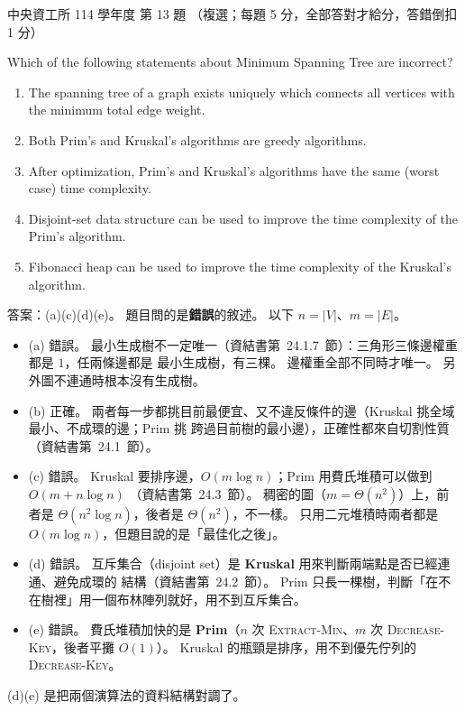 \begin{pastexam}[label={px:ncu-114-dsa-13}]{中央資工所 114 學年度 第 13 題}
（複選；每題 5 分，全部答對才給分，答錯倒扣 1 分）

Which of the following statements about Minimum Spanning Tree are incorrect?
\begin{enumerate}[label=(\alph*)]
\item The spanning tree of a graph exists uniquely which connects all vertices with the minimum total
edge weight.
\item Both Prim's and Kruskal's algorithms are greedy algorithms.
\item After optimization, Prim's and Kruskal's algorithms have the same (worst case) time complexity.
\item Disjoint-set data structure can be used to improve the time complexity of the Prim's algorithm.
\item Fibonacci heap can be used to improve the time complexity of the Kruskal's algorithm.
\end{enumerate}
\end{pastexam}

\begin{pastsoln}
答案：(a)(c)(d)(e)。 題目問的是\textbf{錯誤}的敘述。 以下 $n = |V|$、$m = |E|$。

\begin{itemize}
\item (a) 錯誤。 最小生成樹不一定唯一（資結書第~24.1.7~節）：三角形三條邊權重都是 $1$，任兩條邊都是
最小生成樹，有三棵。 邊權重全部不同時才唯一。 另外圖不連通時根本沒有生成樹。
\item (b) 正確。 兩者每一步都挑目前最便宜、又不違反條件的邊（Kruskal 挑全域最小、不成環的邊；Prim 挑
跨過目前樹的最小邊），正確性都來自切割性質（資結書第~24.1~節）。
\item (c) 錯誤。 Kruskal 要排序邊，$O(m \log n)$；Prim 用費氏堆積可以做到 $O(m + n \log n)$
（資結書第~24.3~節）。 稠密的圖（$m = \Theta(n^2)$）上，前者是 $\Theta(n^2 \log n)$，後者是
$\Theta(n^2)$，不一樣。 只用二元堆積時兩者都是 $O(m \log n)$，但題目說的是「最佳化之後」。
\item (d) 錯誤。 互斥集合（disjoint set）是 \textbf{Kruskal} 用來判斷兩端點是否已經連通、避免成環的
結構（資結書第~24.2~節）。 Prim 只長一棵樹，判斷「在不在樹裡」用一個布林陣列就好，用不到互斥集合。
\item (e) 錯誤。 費氏堆積加快的是 \textbf{Prim}（$n$ 次 \textsc{Extract-Min}、$m$ 次
\textsc{Decrease-Key}，後者平攤 $O(1)$）。 Kruskal 的瓶頸是排序，用不到優先佇列的 \textsc{Decrease-Key}。
\end{itemize}
(d)(e) 是把兩個演算法的資料結構對調了。
\end{pastsoln}
